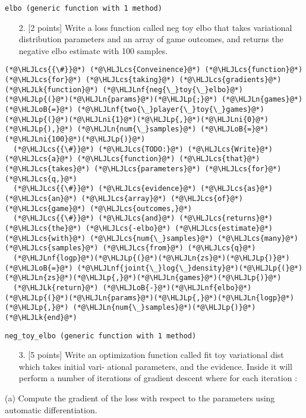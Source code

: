 \documentclass[12pt,a4paper]{article}
\newcommand{\HLJLk}[1]{\textcolor[RGB]{148,91,176}{\textbf{#1}}}
\newcommand{\HLJLn}[1]{#1}
\newcommand{\HLJLnf}[1]{\textcolor[RGB]{66,102,213}{#1}}
\newcommand{\HLJLni}[1]{\textcolor[RGB]{59,151,46}{#1}}
\newcommand{\HLJLoB}[1]{\textcolor[RGB]{102,102,102}{\textbf{#1}}}
\newcommand{\HLJLp}[1]{#1}
\newcommand{\HLJLcs}[1]{\textcolor[RGB]{153,153,119}{\textit{#1}}}
\begin{document}
\begin{lstlisting}
elbo (generic function with 1 method)
\end{lstlisting}


\begin{itemize}
\item[2. ] [2 points] Write a loss function called neg toy elbo that takes variational distribution parameters and an array of game outcomes, and returns the negative elbo estimate with 100 samples.

\end{itemize}

\begin{lstlisting}
(*@\HLJLcs{{\#}}@*) (*@\HLJLcs{Conveinence}@*) (*@\HLJLcs{function}@*) (*@\HLJLcs{for}@*) (*@\HLJLcs{taking}@*) (*@\HLJLcs{gradients}@*)
(*@\HLJLk{function}@*) (*@\HLJLnf{neg{\_}toy{\_}elbo}@*)(*@\HLJLp{(}@*)(*@\HLJLn{params}@*)(*@\HLJLp{;}@*) (*@\HLJLn{games}@*) (*@\HLJLoB{=}@*) (*@\HLJLnf{two{\_}player{\_}toy{\_}games}@*)(*@\HLJLp{(}@*)(*@\HLJLni{1}@*)(*@\HLJLp{,}@*)(*@\HLJLni{0}@*)(*@\HLJLp{),}@*) (*@\HLJLn{num{\_}samples}@*) (*@\HLJLoB{=}@*) (*@\HLJLni{100}@*)(*@\HLJLp{)}@*)
  (*@\HLJLcs{{\#}}@*) (*@\HLJLcs{TODO:}@*) (*@\HLJLcs{Write}@*) (*@\HLJLcs{a}@*) (*@\HLJLcs{function}@*) (*@\HLJLcs{that}@*) (*@\HLJLcs{takes}@*) (*@\HLJLcs{parameters}@*) (*@\HLJLcs{for}@*) (*@\HLJLcs{q,}@*)
  (*@\HLJLcs{{\#}}@*) (*@\HLJLcs{evidence}@*) (*@\HLJLcs{as}@*) (*@\HLJLcs{an}@*) (*@\HLJLcs{array}@*) (*@\HLJLcs{of}@*) (*@\HLJLcs{game}@*) (*@\HLJLcs{outcomes,}@*)
  (*@\HLJLcs{{\#}}@*) (*@\HLJLcs{and}@*) (*@\HLJLcs{returns}@*) (*@\HLJLcs{the}@*) (*@\HLJLcs{-elbo}@*) (*@\HLJLcs{estimate}@*) (*@\HLJLcs{with}@*) (*@\HLJLcs{num{\_}samples}@*) (*@\HLJLcs{many}@*) (*@\HLJLcs{samples}@*) (*@\HLJLcs{from}@*) (*@\HLJLcs{q}@*)
  (*@\HLJLnf{logp}@*)(*@\HLJLp{(}@*)(*@\HLJLn{zs}@*)(*@\HLJLp{)}@*) (*@\HLJLoB{=}@*) (*@\HLJLnf{joint{\_}log{\_}density}@*)(*@\HLJLp{(}@*)(*@\HLJLn{zs}@*)(*@\HLJLp{,}@*)(*@\HLJLn{games}@*)(*@\HLJLp{)}@*)
  (*@\HLJLk{return}@*) (*@\HLJLoB{-}@*)(*@\HLJLnf{elbo}@*)(*@\HLJLp{(}@*)(*@\HLJLn{params}@*)(*@\HLJLp{,}@*)(*@\HLJLn{logp}@*)(*@\HLJLp{,}@*) (*@\HLJLn{num{\_}samples}@*)(*@\HLJLp{)}@*)
(*@\HLJLk{end}@*)
\end{lstlisting}

\begin{lstlisting}
neg_toy_elbo (generic function with 1 method)
\end{lstlisting}


\begin{itemize}
\item[3. ] [5 points] Write an optimization function called fit toy variational dist which takes initial vari- ational parameters, and the evidence. Inside it will perform a number of iterations of gradient descent where for each iteration :

\end{itemize}
(a)  Compute the gradient of the loss with respect to the parameters using automatic differentiation.
\end{document}
